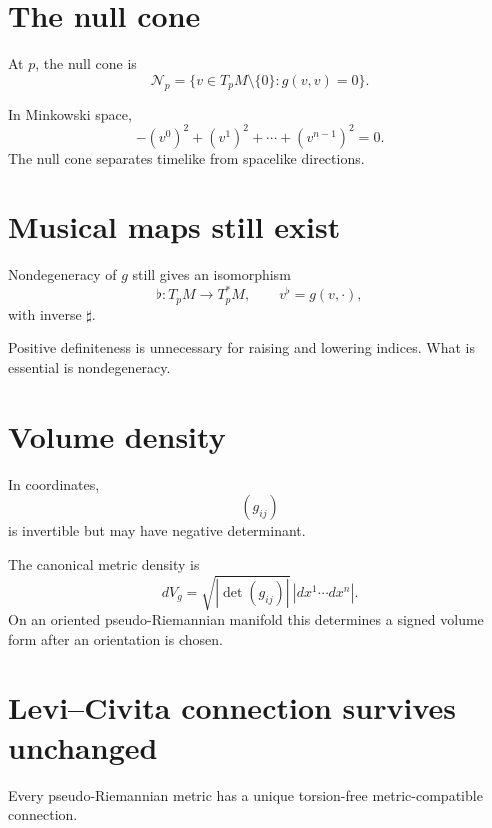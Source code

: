 \section{The null cone}

\begin{definition}\label{def:vii29-null-cone}
At \(p\), the null cone is
\[
\mathcal N_p
=
\{v\in T_pM\setminus\{0\}:g(v,v)=0\}.
\]
\end{definition}

In Minkowski space,
\[
-(v^0)^2+(v^1)^2+\cdots+(v^{n-1})^2=0.
\]
The null cone separates timelike from spacelike directions.

\section{Musical maps still exist}

\begin{proposition}\label{prop:vii29-musical}
Nondegeneracy of \(g\) still gives an isomorphism
\[
\flat:T_pM\to T_p^*M,
\qquad
v^\flat=g(v,\cdot),
\]
with inverse \(\sharp\).
\end{proposition}

\begin{remark}
Positive definiteness is unnecessary for raising and lowering indices.  What is
essential is nondegeneracy.
\end{remark}

\section{Volume density}

In coordinates,
\[
(g_{ij})
\]
is invertible but may have negative determinant.

\begin{definition}\label{def:vii29-density}
The canonical metric density is
\[
dV_g
=
\sqrt{|\det(g_{ij})|}\,
|dx^1\cdots dx^n|.
\]
On an oriented pseudo-Riemannian manifold this determines a signed volume form
after an orientation is chosen.
\end{definition}

\section{Levi--Civita connection survives unchanged}

\begin{theorem}\label{thm:vii29-lc}
Every pseudo-Riemannian metric has a unique torsion-free metric-compatible
connection.
\end{theorem}

